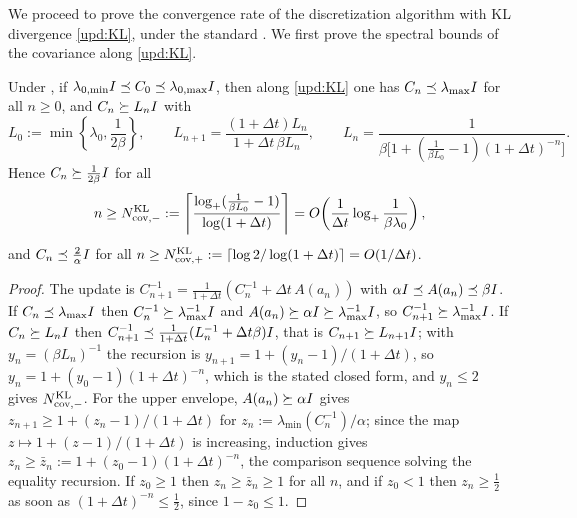 We proceed to prove the convergence rate of the discretization algorithm with KL divergence
\eqref{upd:KL}, under the standard . We first prove the
spectral bounds of the covariance along \eqref{upd:KL}.

\begin{lemma}\label{lem:cov-KL}
    Under , if
    $\lambda_{0,\min}I\preceq C_0\preceq\lambda_{0,\max}I$, then along \eqref{upd:KL} one
    has $C_n\preceq\lambda_{\max}I$ for all $n\geq0$, and $C_n\succeq L_nI$ with
    \begin{equation*}
        L_0:=\min\left\{\lambda_0,\frac1{2\beta}\right\},
        \qquad
        L_{n+1}=\frac{(1+\Delta t)L_n}{1+\Delta t\,\beta L_n},
        \qquad
        L_n=\frac1{\beta\bigl[1+(\tfrac1{\beta L_0}-1)(1+\Delta t)^{-n}\bigr]} .
    \end{equation*}
    Hence $C_n\succeq\tfrac1{2\beta}I$ for all
    \begin{equation*}
        n\geq
        N_{\mathrm{cov},-}^{\mathrm{KL}}
        :=\left\lceil\frac{\log_+(\tfrac1{\beta L_0}-1)}{\log(1+\Delta t)}\right\rceil
        =O\!\left(\frac1{\Delta t}\log_+\frac1{\beta\lambda_0}\right),
    \end{equation*}
    and $C_n\preceq\tfrac2\alpha I$ for all
    $n\geq N_{\mathrm{cov},+}^{\mathrm{KL}}:=\lceil\log2/\log(1+\Delta t)\rceil=O(1/\Delta t)$.
\end{lemma}

\begin{proof}
    The update is $C_{n+1}^{-1}=\tfrac1{1+\Delta t}(C_n^{-1}+\Delta t\,A(a_n))$ with
    $\alpha I\preceq A(a_n)\preceq\beta I$. If $C_n\preceq\lambda_{\max}I$ then
    $C_n^{-1}\succeq\lambda_{\max}^{-1}I$ and
    $A(a_n)\succeq\alpha I\succeq\lambda_{\max}^{-1}I$, so
    $C_{n+1}^{-1}\succeq\lambda_{\max}^{-1}I$. If $C_n\succeq L_nI$ then
    $C_{n+1}^{-1}\preceq\tfrac1{1+\Delta t}(L_n^{-1}+\Delta t\beta)I$, that is
    $C_{n+1}\succeq L_{n+1}I$; with $y_n=(\beta L_n)^{-1}$ the recursion is
    $y_{n+1}=1+(y_n-1)/(1+\Delta t)$, so $y_n=1+(y_0-1)(1+\Delta t)^{-n}$, which is the stated
    closed form, and $y_n\leq2$ gives $N_{\mathrm{cov},-}^{\mathrm{KL}}$. For the upper envelope,
    $A(a_n)\succeq\alpha I$ gives $z_{n+1}\geq1+(z_n-1)/(1+\Delta t)$ for
    $z_n:=\lambda_{\min}(C_n^{-1})/\alpha$; since the map $z\mapsto1+(z-1)/(1+\Delta t)$ is
    increasing, induction gives $z_n\geq\bar z_n:=1+(z_0-1)(1+\Delta t)^{-n}$, the comparison
    sequence solving the equality recursion. If $z_0\geq1$
    then $z_n\geq\bar z_n\geq1$ for all $n$, and if $z_0<1$ then $z_n\geq\tfrac12$ as soon as
    $(1+\Delta t)^{-n}\leq\tfrac12$, since $1-z_0\leq1$.
\end{proof}

